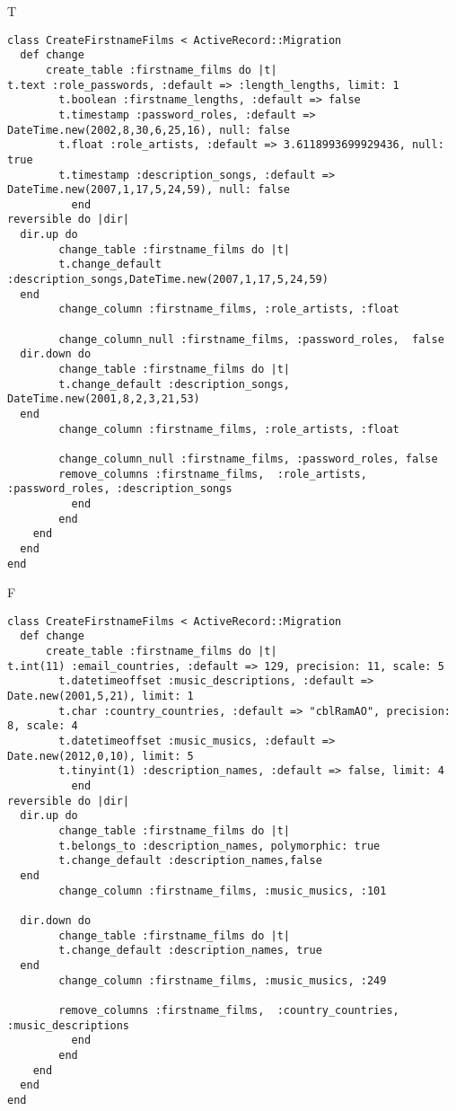 T
\begin{verbatim}
class CreateFirstnameFilms < ActiveRecord::Migration
  def change
	  create_table :firstname_films do |t|
t.text :role_passwords, :default => :length_lengths, limit: 1
		t.boolean :firstname_lengths, :default => false
		t.timestamp :password_roles, :default => DateTime.new(2002,8,30,6,25,16), null: false
		t.float :role_artists, :default => 3.6118993699929436, null: true
		t.timestamp :description_songs, :default => DateTime.new(2007,1,17,5,24,59), null: false
		  end
reversible do |dir|
  dir.up do
		change_table :firstname_films do |t|
		t.change_default :description_songs,DateTime.new(2007,1,17,5,24,59)
  end
 		change_column :firstname_films, :role_artists, :float
   
		change_column_null :firstname_films, :password_roles,  false
  dir.down do
		change_table :firstname_films do |t|
		t.change_default :description_songs, DateTime.new(2001,8,2,3,21,53)
  end
 		change_column :firstname_films, :role_artists, :float
   
		change_column_null :firstname_films, :password_roles, false
 		remove_columns :firstname_films,  :role_artists, :password_roles, :description_songs 
	      end
	    end
    end 
  end
end

\end{verbatim}

F
\begin{verbatim}
class CreateFirstnameFilms < ActiveRecord::Migration
  def change
	  create_table :firstname_films do |t|
t.int(11) :email_countries, :default => 129, precision: 11, scale: 5
		t.datetimeoffset :music_descriptions, :default => Date.new(2001,5,21), limit: 1
		t.char :country_countries, :default => "cblRamAO", precision: 8, scale: 4
		t.datetimeoffset :music_musics, :default => Date.new(2012,0,10), limit: 5
		t.tinyint(1) :description_names, :default => false, limit: 4
		  end
reversible do |dir|
  dir.up do
		change_table :firstname_films do |t|
		t.belongs_to :description_names, polymorphic: true
 		t.change_default :description_names,false
  end
 		change_column :firstname_films, :music_musics, :101
   
  dir.down do
		change_table :firstname_films do |t|
		t.change_default :description_names, true
  end
 		change_column :firstname_films, :music_musics, :249
   
		remove_columns :firstname_films,  :country_countries, :music_descriptions 
	      end
	    end
    end 
  end
end

\end{verbatim}

